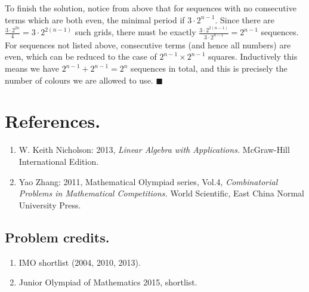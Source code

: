 \documentclass[11pt,a4paper]{article}
\begin{document}
To finish the solution, notice from above that for sequences with no consecutive terms which are both even, the minimal period if $3\cdot 2^{n-1}$. Since there are $\frac{3\cdot 2^{2n}}{4}=3\cdot 2^{2(n-1)}$ such grids, there must be exactly $\frac{3\cdot 2^{2(n-1)}}{3\cdot 2^{n-1}}=2^{n-1}$ sequences. For sequences not listed above, consecutive terms (and hence all numbers) are even, which can be reduced to the case of $2^{n-1}\times 2^{n-1}$ squares. Inductively this means we have $2^{n-1}+2^{n-1}=2^n$ sequences in total, and this is precisely the number of colours we are allowed to use. $\blacksquare$

\section {References.}
\begin{enumerate}
\item W. Keith Nicholson: 2013, \emph {Linear Algebra with Applications.} McGraw-Hill International Edition.
\item Yao Zhang: 2011, Mathematical Olympiad series, Vol.4, \emph {Combinatorial Problems in Mathematical Competitions.} World Scientific, East China Normal University Press.
\end{enumerate}

\subsection{Problem credits.}
\begin{enumerate}
\item IMO shortlist (2004, 2010, 2013).
\item Junior Olympiad of Mathematics 2015, shortlist.
\end{enumerate}
\end{document}
